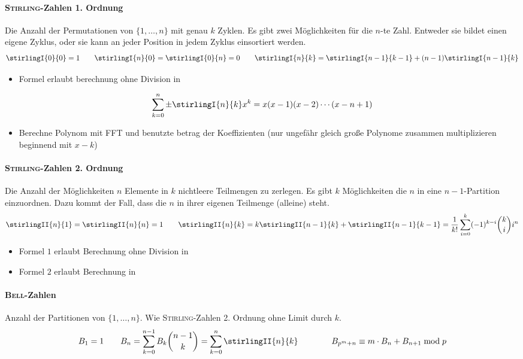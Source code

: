 \paragraph{\textsc{Stirling}-Zahlen 1. Ordnung}
Die Anzahl der Permutationen von $\{1, \ldots, n\}$ mit genau $k$ Zyklen.
Es gibt zwei Möglichkeiten für die $n$-te Zahl. Entweder sie bildet einen eigene Zyklus, oder sie kann an jeder Position in jedem Zyklus einsortiert werden.
\[\stirlingI{0}{0} = 1 \qquad
\stirlingI{n}{0} = \stirlingI{0}{n} = 0 \qquad
\stirlingI{n}{k} = \stirlingI{n-1}{k-1} + (n-1) \stirlingI{n-1}{k}\]
\begin{itemize}
	\item Formel erlaubt berechnung ohne Division in 
\end{itemize}
\[\sum_{k=0}^{n}\pm\stirlingI{n}{k}x^k=x(x-1)(x-2)\cdots(x-n+1)\]
\begin{itemize}
	\item Berechne Polynom mit FFT und benutzte betrag der Koeffizienten  (nur ungefähr gleich große Polynome zusammen multiplizieren beginnend mit $x-k$)
\end{itemize}

\paragraph{\textsc{Stirling}-Zahlen 2. Ordnung}
Die Anzahl der Möglichkeiten $n$ Elemente in $k$ nichtleere Teilmengen zu zerlegen.
Es gibt $k$ Möglichkeiten die $n$ in eine $n-1$-Partition einzuordnen.
Dazu kommt der Fall, dass die $n$ in ihrer eigenen Teilmenge (alleine) steht.
\[\stirlingII{n}{1} = \stirlingII{n}{n} = 1 \qquad
\stirlingII{n}{k} = k \stirlingII{n-1}{k} + \stirlingII{n-1}{k-1} =
\frac{1}{k!} \sum\limits_{i=0}^{k} (-1)^{k-i}\binom{k}{i}i^n\]
\begin{itemize}
	\item Formel $1$ erlaubt Berechnung ohne Division in 
	\item Formel $2$ erlaubt Berechnung in 
\end{itemize}

\paragraph{\textsc{Bell}-Zahlen}
Anzahl der Partitionen von $\{1, \ldots, n\}$.
Wie \textsc{Stirling}-Zahlen 2. Ordnung ohne Limit durch $k$.
\[B_1 = 1 \qquad
B_n = \sum\limits_{k = 0}^{n - 1} B_k\binom{n-1}{k}
= \sum\limits_{k = 0}^{n}\stirlingII{n}{k}\qquad\qquad B_{p^m+n}\equiv m\cdot B_n + B_{n+1} \bmod{p}\]

